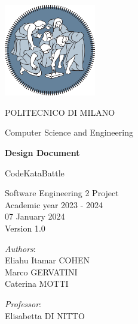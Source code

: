 \begin{titlingpage}
	\begin{center}
		\includegraphics[width=0.3\textwidth]{images/logo_polimi.png}
		
		\vspace{0.25cm}
		
		\LARGE POLITECNICO DI MILANO\\
		
		\vspace{0.2cm}
		
		\Large Computer Science and Engineering
		
		\vspace{0.8cm}
	
		\Huge \textbf{Design Document}
		
		\vspace{0.5cm}
		\huge CodeKataBattle
		
		\vspace{1.5cm}
		\LARGE Software Engineering 2 Project\\
		\Large Academic year 2023 - 2024\\
		\vspace{1cm}
		07 January 2024\\Version 1.0
		\vspace{3cm}
		
		\large
		\begin{minipage}{.4\textwidth}
			\textit{Authors}:\\
			Eliahu Itamar COHEN\\
			Marco GERVATINI\\
                Caterina MOTTI
		\end{minipage}%
		\begin{minipage}{.4\textwidth}
			\raggedleft	
			\textit{Professor}:\\
			Elisabetta DI NITTO\\
			\phantom{placeholder}
		\end{minipage}%
		\begin{minipage}{.1\textwidth}
			\null
		\end{minipage}
		
		\end{center}
\end{titlingpage}

